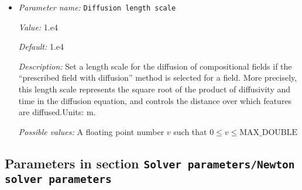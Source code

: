 \begin{itemize}
\item {\it Parameter name:} {\tt Diffusion length scale}
\label{parameters:Solver parameters/Diffusion solver parameters/Diffusion length scale}


{\it Value:} 1.e4


{\it Default:} 1.e4


{\it Description:} Set a length scale for the diffusion of compositional fields if the ``prescribed field with diffusion'' method is selected for a field. More precisely, this length scale represents the square root of the product of diffusivity and time in the diffusion equation, and controls the distance over which features are diffused.Units: m.


{\it Possible values:} A floating point number $v$ such that $0 \leq v \leq \text{MAX\_DOUBLE}$
\end{itemize}

\subsection{Parameters in section \tt Solver parameters/Newton solver parameters}
\label{parameters:Solver_20parameters/Newton_20solver_20parameters}

